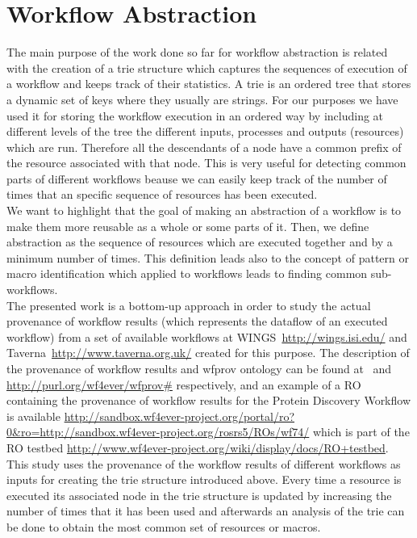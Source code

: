 \section{Workflow Abstraction}

\label{sec:abstraction}
The main purpose of the work done so far for workflow abstraction is related with the creation of a trie structure which captures the sequences of execution of a workflow and keeps track of their statistics. A trie is an ordered tree that stores a dynamic set of keys where they usually are strings. For our purposes we have used it for storing the workflow execution in an ordered way by including at different levels of the tree the different inputs, processes and outputs (resources) which are run. Therefore all the descendants of a node have a common prefix of the resource associated with that node. This is very useful for detecting common parts of different workflows beause we can easily keep track of the number of times that an specific sequence of resources has been executed. \\

We want to highlight that the goal of making an abstraction of a workflow is to make them more reusable as a whole or some parts of it. Then, we define abstraction as the sequence of resources which are executed together and by a minimum number of times. This definition leads also to the concept of pattern or macro identification which applied to workflows leads to finding common sub-workflows. \\ 

The presented work is a bottom-up approach in order to study the actual provenance of workflow results (which represents the dataflow of an executed workflow) from a set of available workflows at WINGS~\url{http://wings.isi.edu/} and Taverna~\url{http://www.taverna.org.uk/} created for this purpose. The description of the provenance of workflow results and wfprov ontology can be found at~\cite{D4.2v1} and \url{http://purl.org/wf4ever/wfprov#} respectively, and an example of a RO containing the provenance of workflow results for the Protein Discovery Workflow is available \url{http://sandbox.wf4ever-project.org/portal/ro?0&ro=http://sandbox.wf4ever-project.org/rosrs5/ROs/wf74/} which is part of the RO testbed \url{http://www.wf4ever-project.org/wiki/display/docs/RO+testbed}. \\


This study uses the provenance of the workflow results of different workflows as inputs for creating the trie structure introduced above. Every time a resource is executed its associated node in the trie structure is updated by increasing the number of times that it has been used and afterwards an analysis of the trie can be done to obtain the most common set of resources or macros. \\
 

